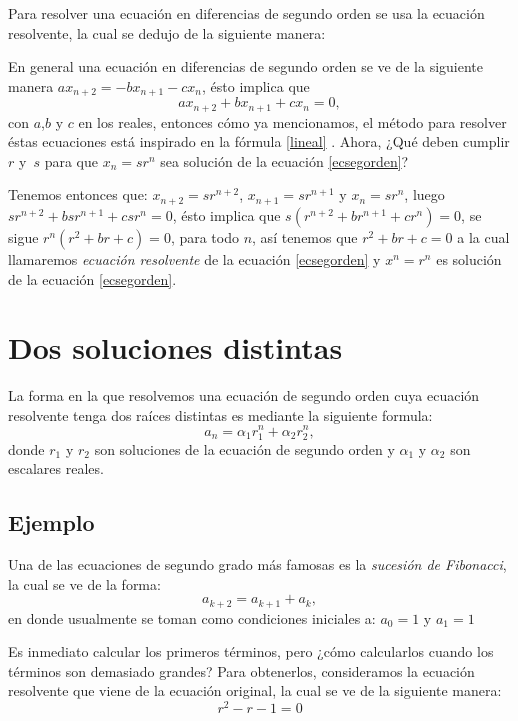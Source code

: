 \documentclass{report}
\begin{document}
Para resolver una ecuación en diferencias de segundo orden se usa la
ecuación resolvente, la cual se dedujo de la siguiente manera:

En general una ecuación en diferencias de segundo orden se ve de la
siguiente manera $ax_{n+2}=-bx_{n+1}-cx_{n}$, ésto implica que
\begin{equation}
  \label{ecsegorden}
  ax_{n+2}+bx_{n+1}+cx_{n}=0,
\end{equation}
con $a$,$b$ y $c$ en los reales, entonces cómo ya mencionamos, el método
para resolver éstas ecuaciones está inspirado en la fórmula \eqref{lineal}
. Ahora, ¿Qué deben cumplir $r$ y~$s$ para que $x_n=sr^n$
sea solución de la ecuación \eqref{ecsegorden}?

Tenemos entonces que: $x_{n+2}=sr^{n+2}$, $x_{n+1}=sr^{n+1}$ y
$x_{n}=sr^{n}$, luego $sr^{n+2}+bsr^{n+1}+csr^n=0$, ésto implica que
$s(r^{n+2}+br^{n+1}+cr^n)=0$, se sigue $r^n(r^2+br+c)=0$, para todo
$n$, así tenemos que $r^2+br+c=0$ a la cual llamaremos
\textit{ecuación resolvente} de la ecuación \eqref{ecsegorden} y
$x^n=r^n$ es solución de la ecuación \eqref{ecsegorden}.



\section{Dos soluciones distintas}
\label{sec:distintas}
La forma en la que resolvemos una ecuación de segundo orden cuya
ecuación resolvente tenga dos raíces distintas es mediante la
siguiente formula:
\begin{equation}
 \label{raicesdistintas}
 a_n=\alpha_1r_1^n +\alpha_2r_2^n,
\end{equation}
donde $r_1$ y $r_2$ son soluciones de la ecuación de segundo orden y
$\alpha_1$ y $\alpha_2$ son escalares reales.
\subsection{Ejemplo}

Una de las ecuaciones de segundo grado más famosas es la \textit{sucesión de
  Fibonacci}, la cual se ve de la forma:
\begin{equation}
  \label{eq:fibonacci}
a_{k+2}=a_{k+1}+a_{k},  
\end{equation}
en donde usualmente se toman como condiciones iniciales a: $a_{0}=1$ y $a_{1}=1$

Es inmediato calcular los primeros términos, pero ¿cómo calcularlos
cuando los términos son demasiado grandes?  Para obtenerlos,
consideramos la ecuación resolvente que viene de la ecuación original,
la cual se ve de la siguiente manera:
$$r^2-r-1=0$$
\end{document}
